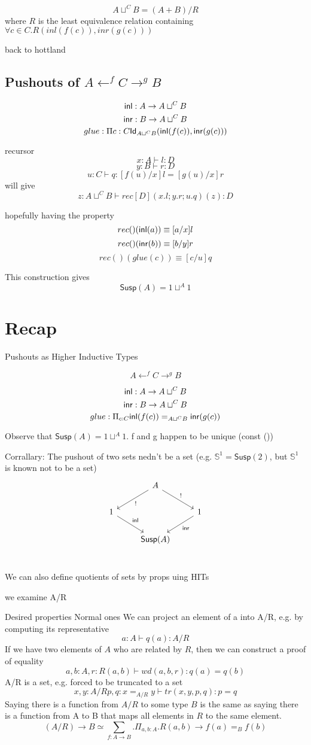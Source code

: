 \documentclass[11pt]{article}
\renewcommand{\SS}{\mathbb{S}}
\newcommand{\susp}[1]{\mathsf{Susp}(#1)}
\begin{document}
$$A \sqcup^C B = (A + B) / R$$
where $R$ is the least equivalence relation containing $\forall c \in C. R(inl(f(c)), inr(g(c)))$

back to hottland

\subsection{Pushouts of $A \leftarrow^f C \rightarrow^g B$}
$${\mathsf{inl}} : A \rightarrow A \sqcup^C B$$
$${\mathsf{inr}} : B \rightarrow A \sqcup^C B$$
$$glue : \Pi c : C \mathsf{Id}_{A \sqcup^C B} ({\mathsf{inl}}(f(c)), {\mathsf{inr}}(g(c)))$$

recursor
$$x : A \vdash l : D$$
$$y : B \vdash r : D$$
$$u : C \vdash q : [f(u)/x]l = [g(u)/x]r$$
will give
$$z : A \sqcup^C B \vdash rec[D](x.l; y.r; u.q)(z) : D$$

hopefully having the property
$$rec( )({\mathsf{inl}}(a)) \equiv [a/x]l$$
$$rec( )({\mathsf{inr}}(b)) \equiv [b/y]r$$
$$rec( )(glue(c)) \equiv [c/u]q$$

This construction gives
$$\susp A = 1 \sqcup^A 1$$

\section{Recap}
Pushouts as Higher Inductive Types

$$A \leftarrow^f C \rightarrow^g B$$

$${\mathsf{inl}} : A \rightarrow A \sqcup^C B$$
$${\mathsf{inr}} : B \rightarrow A \sqcup^C B$$
$$glue : \Pi_{c : C} {\mathsf{inl}}(f(c)) =_{A \sqcup^C B} {\mathsf{inr}}(g(c))$$

Observe that $\susp{A} = 1 \sqcup^A 1$. f and g happen to be unique (const ())

Corrallary: The pushout of two sets nedn't be a set (e.g. $\SS^1 = \susp{2}$, but $\SS^1$ is known not to be a set)
\begin{equation*}
\begin{tikzcd}
{} & A \arrow{dr}{!} \arrow{dl}{!} & {}\\
1 \arrow{dr}{\inl} & {} & 1 \arrow{dl}{\inr} \\
{} & \susp{A} & {}\\
\end{tikzcd}
\end{equation*}

We can also define quotients of sets by props uing HITs

we examine A/R

Desired properties
Normal ones
We can project an element of a into A/R, e.g. by computing its representative
$$a : A \vdash q(a) : A/R$$
If we have two elements of $A$ who are related by $R$, then we can construct a proof of equality
$$a, b : A, r : R(a, b) \vdash wd(a, b, r) : q(a) = q(b)$$
A/R is a set, e.g. forced to be truncated to a set
$$x, y : A/R p, q : x =_{A/R} y \vdash tr(x, y, p, q) : p = q$$
Saying there is a function from $A/R$ to some type $B$ is the same as saying there is a function from A to B that maps all elements in $R$ to the same element.
$$(A/R) \rightarrow B \simeq \sum_{f : A \rightarrow B} . \Pi_{a, b : A} . R(a, b) \rightarrow f(a) =_B f(b)$$
\end{document}
